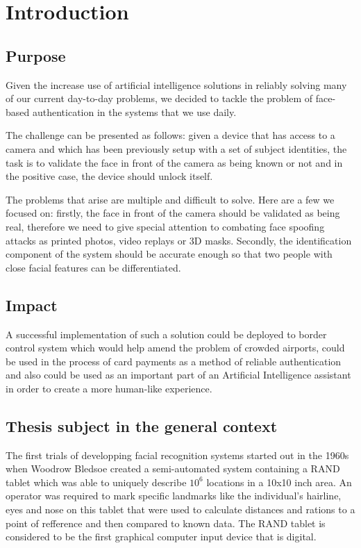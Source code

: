 \chapter{Introduction}

\section{Purpose}

Given the increase use of artificial intelligence solutions in reliably solving many of our current day-to-day problems, we decided to tackle the problem of face-based authentication in the systems that we use daily.

The challenge can be presented as follows: given a device that has access to a camera and which has been previously setup with a set of subject identities, the task is to validate the face in front of the camera as being known or not and in the positive case, the device should unlock itself.

The problems that arise are multiple and difficult to solve. Here are a few we focused on: firstly, the face in front of the camera should be validated as being real, therefore we need to give special attention to combating face spoofing attacks as printed photos, video replays or 3D masks. Secondly, the identification component of the system should be accurate enough so that two people with close facial features can be differentiated.

\section{Impact}
A successful implementation of such a solution could be deployed to border control system which would help amend the problem of crowded airports, could be used in the process of card payments as a method of reliable authentication and also could be used as an important part of an Artificial Intelligence assistant in order to create a more human-like experience.

\section{Thesis subject in the general context}
The first trials of developping facial recognition systems started out in the 1960s when Woodrow Bledsoe created a semi-automated system \cite{DavisMRETO64} containing a RAND tablet which was able to uniquely describe $10^{6}$ locations in a 10x10 inch area.
An operator was required to mark specific landmarks like the individual's  hairline, eyes and nose on this tablet that were used to calculate distances and rations to a point of refference and then compared to known data. The RAND tablet is considered to be the first graphical computer input device that is digital.

